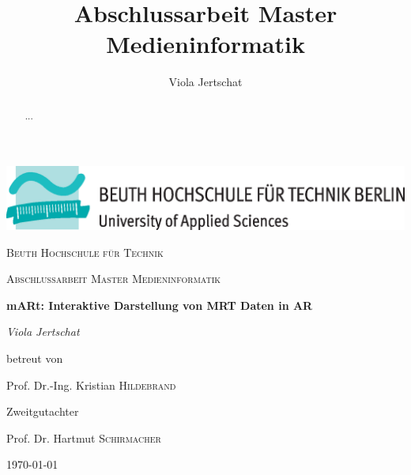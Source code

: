 \documentclass[a4paper,11pt]{report}
\title{Abschlussarbeit Master Medieninformatik}
\author{Viola Jertschat}
\begin{document}
\begin{titlepage}
	\centering
	\includegraphics[width=\textwidth]{images/beuthlogo.eps}\par\vspace{1cm}
	{\scshape\LARGE Beuth Hochschule für Technik \par}
	\vspace{1cm}
	{\scshape\Large Abschlussarbeit Master Medieninformatik\par}
	\vspace{1.5cm}
	{\huge\bfseries mARt: Interaktive Darstellung von MRT Daten in AR\par}
	\vspace{2cm}
	{\Large\itshape Viola Jertschat\par}
	\vfill
	betreut von\par
	Prof. Dr.-Ing. Kristian \textsc{Hildebrand}
	
	\vfill
	Zweitgutachter\par
	Prof. Dr. Hartmut \textsc{Schirmacher}

	\vfill

	{\large \today\par}
\end{titlepage}

\begin{abstract} 
...
\end{abstract}

\tableofcontents

\listoffigures

\printglossaries


%








\pagebreak

\printbibliography
\end{document}

